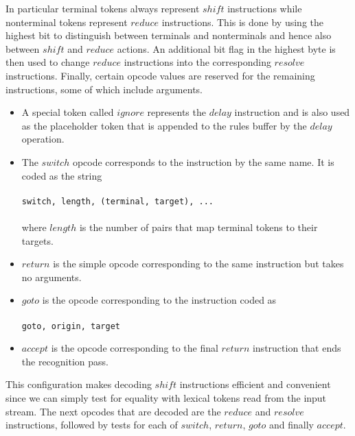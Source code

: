 \documentclass[a4paper,11pt]{article}
\begin{document}
In particular terminal tokens always represent $shi\!ft$ instructions while nonterminal tokens represent $reduce$ instructions.
This is done by using the highest bit to distinguish between terminals and nonterminals and hence also between $shi\!ft$ and $reduce$ actions.
An additional bit flag in the highest byte is then used to change $reduce$ instructions into the corresponding $resolve$ instructions.
Finally, certain opcode values are reserved for the remaining instructions, some of which include arguments.


\begin{itemize}
\item A special token called $ignore$ represents the $delay$ instruction and is also used as the placeholder token that is appended to the rules buffer by the $delay$ operation.
\item The $switch$ opcode corresponds to the instruction by the same name. It is coded as the string\\\\
      \texttt{switch, length, (terminal, target), ...}\\\\
      where $length$ is the number of pairs that map terminal tokens to their targets.
\item $return$ is the simple opcode corresponding to the same instruction but takes no arguments.
\item $goto$ is the opcode corresponding to the instruction coded as\\\\
      \texttt{goto, origin, target}\\
\item $accept$ is the opcode corresponding to the final $return$ instruction that ends the recognition pass.
\end{itemize}


This configuration makes decoding $shi\!ft$ instructions efficient and convenient since we can simply test for equality with lexical tokens read from the input stream. 
The next opcodes that are decoded are the $reduce$ and $resolve$ instructions, followed by tests for each of $switch$, $return$, $goto$ and finally $accept$.
\end{document}
